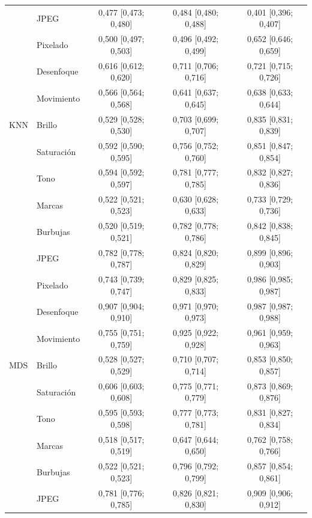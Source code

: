 {\begin{longtable}{llccc}
 & JPEG & 0{,}477 [0{,}473; 0{,}480] & 0{,}484 [0{,}480; 0{,}488] & 0{,}401 [0{,}396; 0{,}407] \\
 & Pixelado & 0{,}500 [0{,}497; 0{,}503] & 0{,}496 [0{,}492; 0{,}499] & 0{,}652 [0{,}646; 0{,}659] \\
 & Desenfoque & 0{,}616 [0{,}612; 0{,}620] & 0{,}711 [0{,}706; 0{,}716] & 0{,}721 [0{,}715; 0{,}726] \\
 & Movimiento & 0{,}566 [0{,}564; 0{,}568] & 0{,}641 [0{,}637; 0{,}645] & 0{,}638 [0{,}633; 0{,}644] \\
\midrule
KNN & Brillo & 0{,}529 [0{,}528; 0{,}530] & 0{,}703 [0{,}699; 0{,}707] & 0{,}835 [0{,}831; 0{,}839] \\
 & Saturación & 0{,}592 [0{,}590; 0{,}595] & 0{,}756 [0{,}752; 0{,}760] & 0{,}851 [0{,}847; 0{,}854] \\
 & Tono & 0{,}594 [0{,}592; 0{,}597] & 0{,}781 [0{,}777; 0{,}785] & 0{,}832 [0{,}827; 0{,}836] \\
 & Marcas & 0{,}522 [0{,}521; 0{,}523] & 0{,}630 [0{,}628; 0{,}633] & 0{,}733 [0{,}729; 0{,}736] \\
 & Burbujas & 0{,}520 [0{,}519; 0{,}521] & 0{,}782 [0{,}778; 0{,}786] & 0{,}842 [0{,}838; 0{,}845] \\
 & JPEG & 0{,}782 [0{,}778; 0{,}787] & 0{,}824 [0{,}820; 0{,}829] & 0{,}899 [0{,}896; 0{,}903] \\
 & Pixelado & 0{,}743 [0{,}739; 0{,}747] & 0{,}829 [0{,}825; 0{,}833] & 0{,}986 [0{,}985; 0{,}987] \\
 & Desenfoque & 0{,}907 [0{,}904; 0{,}910] & 0{,}971 [0{,}970; 0{,}973] & 0{,}987 [0{,}987; 0{,}988] \\
 & Movimiento & 0{,}755 [0{,}751; 0{,}759] & 0{,}925 [0{,}922; 0{,}928] & 0{,}961 [0{,}959; 0{,}963] \\
\midrule
MDS & Brillo & 0{,}528 [0{,}527; 0{,}529] & 0{,}710 [0{,}707; 0{,}714] & 0{,}853 [0{,}850; 0{,}857] \\
 & Saturación & 0{,}606 [0{,}603; 0{,}608] & 0{,}775 [0{,}771; 0{,}779] & 0{,}873 [0{,}869; 0{,}876] \\
 & Tono & 0{,}595 [0{,}593; 0{,}598] & 0{,}777 [0{,}773; 0{,}781] & 0{,}831 [0{,}827; 0{,}834] \\
 & Marcas & 0{,}518 [0{,}517; 0{,}519] & 0{,}647 [0{,}644; 0{,}650] & 0{,}762 [0{,}758; 0{,}766] \\
 & Burbujas & 0{,}522 [0{,}521; 0{,}523] & 0{,}796 [0{,}792; 0{,}799] & 0{,}857 [0{,}854; 0{,}861] \\
 & JPEG & 0{,}781 [0{,}776; 0{,}785] & 0{,}826 [0{,}821; 0{,}830] & 0{,}909 [0{,}906; 0{,}912] \\

\end{longtable}}
